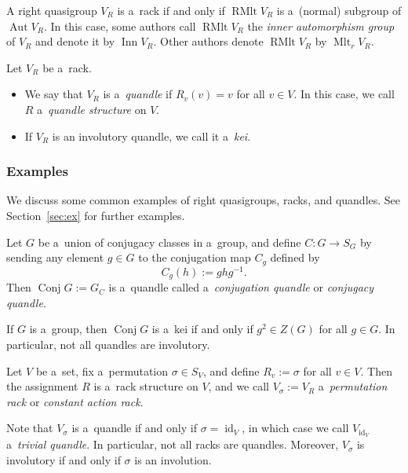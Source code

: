 \documentclass{jonasart}
\DeclareMathOperator{\Aut}{Aut}
\DeclareMathOperator{\Conj}{Conj}
\DeclareMathOperator{\id}{id}
\DeclareMathOperator{\Inn}{Inn}
\DeclareMathOperator{\RMlt}{RMlt}
\newcommand{\inv}{^{-1}}
\begin{document}
	\begin{remark}
		A right quasigroup $V_R$ is a~rack if and only if $\RMlt V_R$ is a~(normal) subgroup of $\Aut V_R$. In this case, some authors call $\RMlt V_R$ the \emph{inner automorphism group} of $V_R$ and denote it by $\Inn V_R$. Other authors denote $\RMlt V_R$ by $\operatorname{Mlt}_r V_R$.
	\end{remark}

	\begin{definition}
		Let $V_R$ be a~rack.
		\begin{itemize}
			\item We say that $V_R$ is a~\emph{quandle} if
			\(
			R_v (v)=v
			\)
			for all $v\in V$. In this case, we call $R$ a~\emph{quandle structure} on $V$.
			\item If $V_R$ is an involutory quandle, we call it a~\emph{kei}.
		\end{itemize}
	\end{definition}

	\subsubsection{Examples} We discuss some common examples of right quasigroups, racks, and quandles. See Section~\ref{sec:ex} for further examples.

	\begin{example}
		Let $G$ be a~union of conjugacy classes in a~group, and define $C:G\rightarrow S_G$ by sending any element $g\in G$ to the conjugation map $C_g$ defined by
		\[
			C_g(h):=ghg\inv.
		\]
		Then $\Conj G:=G_C$ is a~quandle called a~\emph{conjugation quandle} or \emph{conjugacy quandle}.

		If $G$ is a~group, then $\Conj G$ is a~kei if and only if $g^2\in Z(G)$ for all $g\in G$. In particular, not all quandles are involutory.
	\end{example}

	\begin{example}
		Let $V$ be a~set, fix a~permutation $\sigma\in S_V$, and define $R_v:=\sigma$ for all $v\in V$. Then the assignment $R$ is a~rack structure on $V$, and we call $V_\sigma:= V_R$ a~\emph{permutation rack} or \emph{constant action rack}.

		Note that $V_\sigma$ is a~quandle if and only if $\sigma=\id_V$, in which case we call $V_{\id_V}$ a~\emph{trivial quandle}. In particular, not all racks are quandles. Moreover, $V_\sigma$ is involutory if and only if $\sigma$ is an involution.
	\end{example}
\end{document}
